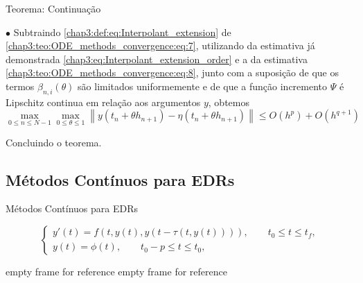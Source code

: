 \documentclass{beamer}
\theoremstyle{plain}
\theoremstyle{definition}
\begin{document}

\begin{frame}{Teorema: Continuação}

    \phantom{aa} $\bullet$  Subtraindo \eqref{chap3:def:eq:Interpolant_extension} de \eqref{chap3:teo:ODE_methods_convergence:eq:7}, utilizando da estimativa já demonstrada \eqref{chap3:eq:Interpolant_extension_order} e a da estimativa \eqref{chap3:teo:ODE_methods_convergence:eq:8}, junto com a suposição de que os termos \(\beta_{n, i}(\theta)\) são limitados uniformemente e de que a função incremento \(\Psi\) é Lipschitz continua em relação aos argumentos \(y\), obtemos
    \[
      \max _{0 \leq n \leq N-1} \max _{0 \leq \theta \leq 1}\left\|y\left(t_{n}+\theta h_{n+1}\right)-\eta\left(t_{n}+\theta h_{n+1}\right)\right\| \leq O\left(h^{p}\right)+O\left(h^{q+1}\right)
    \]

    \noindent 
     Concluindo o teorema.
\end{frame}



\subsection{Métodos Contínuos para EDRs}


\begin{frame}{Métodos Contínuos para EDRs}
    

  \begin{equation}
    \begin{cases}
      y'(t) = f(t, y(t), y(t - \tau(t, y(t)))), \qquad t_0 \leq t \leq t_f , \\
      y(t) = \phi(t), \qquad t_0 - p \leq t \leq t_0,
    \end{cases}
    \label{chap3:def:EDR}
  \end{equation}
\end{frame}



\begin{frame}{empty frame for reference}
     empty frame for reference
\end{frame}

\end{document}
